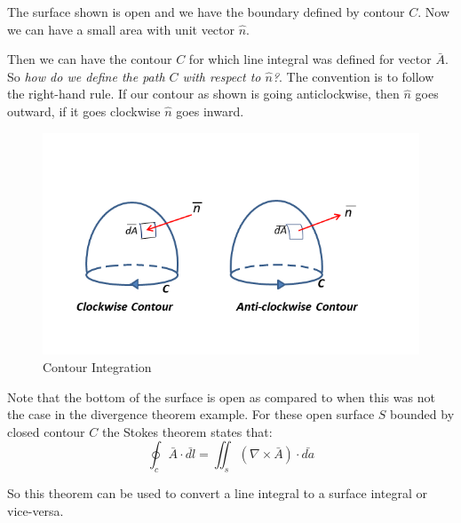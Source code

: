 The surface shown is open and we have the boundary defined by contour $C$. Now we can have a small area with unit vector $\hat n$.

Then we can have the contour $C$ for which line integral was defined for vector $\bar{A}$. So \emph{how do we define the path $C$ with respect to $\hat{n}$?}. The convention is to follow the right-hand rule. If our contour as shown is going anticlockwise, then $\hat n$ goes outward, if it goes clockwise $\hat n$ goes inward.

\begin{figure}
\centering
\includegraphics[width=1.2\linewidth]{graphics/contour_integral}
\caption{Contour Integration}
\end{figure}

Note that the bottom of the surface is open as compared to when this was not the case in the divergence theorem example. For these open surface $S$ bounded by closed contour $C$ the Stokes theorem states that:
\begin{equation}
\oint_c \bar{A} \cdot \bar{dl} = \iint_s  (\nabla \times \bar{A})\cdot\bar{da}
\end{equation}

So this theorem can be used to convert a line integral to a surface integral or vice-versa.


